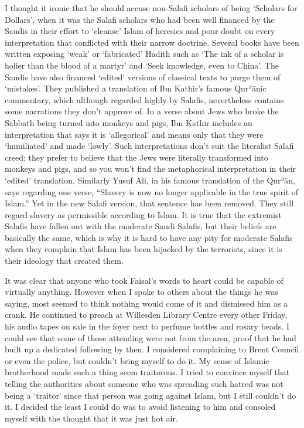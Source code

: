 \documentclass[12pt]{memoir}
\def\´{ʾ} %
\def \Quran{Qur\-\´ān} %
\begin{document}
I thought it ironic that he should accuse non-Salafi scholars of being
‘Scholars for Dollars’, when it was the Salafi scholars
who had been well financed by the Saudis in their effort
to ‘cleanse’ Islam of heresies and pour doubt on every interpretation
that conflicted with their narrow doctrine.
Several books have been written exposing ‘weak’ or ‘fabricated’ Hadith
such as ‘The ink of a scholar is holier than the blood of a martyr’
and ‘Seek knowledge, even to China’.
The Saudis have also financed ‘edited’ versions of classical texts
to purge them of ‘mistakes’.
They published a translation of Ibn Kathir’s famous \Quran{}ic commentary,
which although regarded highly by Salafis,
nevertheless contains some narrations they don’t approve of.
In a verse about Jews who broke the Sabbath being turned into monkeys and pigs,
Ibn Kathir includes an interpretation that says it is ‘allegorical’
and means only that they were ‘humiliated’ and made ‘lowly’.
Such interpretations don’t suit the literalist Salafi creed;
they prefer to believe that the Jews were literally transformed
into monkeys and pigs, and so you won’t find
the metaphorical interpretation in their ‘edited’ translation.
Similarly Yusuf Ali, in his famous translation of the \Quran,
says regarding one verse,
“Slavery is now no longer applicable in the true spirit of Islam.”
Yet in the new Salafi version, that sentence has been removed.
They still regard slavery as permissible according to Islam.
It is true that the extremist Salafis have fallen out
with the moderate Saudi Salafis,
but their beliefs are basically the same,
which is why it is hard to have any pity for moderate Salafis
when they complain that Islam has been hijacked by the terrorists,
since it is their ideology that created them.

It was clear that anyone who took Faisal’s words to heart
could be capable of virtually anything.
However when I spoke to others about the things he was saying,
most seemed to think nothing would come of it and dismissed him as a crank.
He continued to preach at Willesden Library Centre every other Friday,
his audio tapes on sale in the foyer next to perfume bottles and rosary beads.
I could see that some of those attending were not from the area,
proof that he had built up a dedicated following by then.
I considered complaining to Brent Council or even the police,
but couldn’t bring myself to do it.
My sense of Islamic brotherhood made such a thing seem traitorous.
I tried to convince myself that telling the authorities about someone
who was spreading such hatred was not being a ‘traitor’
since that person was going against Islam, but I still couldn’t do it.
I decided the least I could do was to avoid listening to him
and consoled myself with the thought that it was just hot air.
\end{document}
